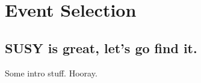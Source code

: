 \chapter{Event Selection}

\ifpdf
    \graphicspath{{Chapter5/Figs/Raster/}{Chapter5/Figs/PDF/}{Chapter5/Figs/}}
\else
    \graphicspath{{Chapter5/Figs/Vector/}{Chapter5/Figs/}}
\fi


\section{SUSY is great, let's go find it.}  %

Some intro stuff. Hooray.